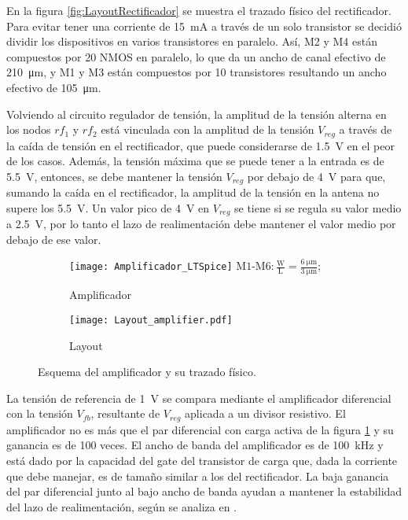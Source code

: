 En la figura \ref{fig:LayoutRectificador} se muestra el trazado físico 
del rectificador. Para evitar tener una corriente de 
\SI{15}{\milli\ampere} a través de un solo transistor se decidió 
dividir los dispositivos en varios transistores en paralelo. Así, M2 y 
M4 están compuestos por 20 NMOS en paralelo, lo que da un ancho de 
canal efectivo de \SI{210}{\micro\meter}, y M1 y M3 están compuestos por 
10 transistores resultando un ancho efectivo de \SI{105}{\micro\meter}.

\bigskip
Volviendo al circuito regulador de tensión, la amplitud de la 
tensión alterna en los nodos \(rf_{1}\) y \(rf_{2}\) está vinculada 
con la amplitud de la tensión \(V_{reg}\) a través de la caída de 
tensión en el rectificador, que puede considerarse de \SI{1.5}{\volt} 
en el peor de los casos. Además, la tensión máxima que se puede 
tener a la entrada es de \SI{5.5}{\volt}, entonces, se debe mantener 
la tensión \(V_{reg}\) por debajo de \SI{4}{\volt} para que, sumando 
la caída en el rectificador, la amplitud de la tensión en la antena 
no supere los \SI{5.5}{\volt}. Un valor pico de \SI{4}{\volt} en 
\(V_{reg}\) se tiene si se regula su valor medio a \SI{2.5}{\volt}, 
por lo tanto el lazo de realimentación debe mantener el valor medio por 
debajo de ese valor.

\begin{figure}
	\centering
	    \begin{subfigure}[b]{0.35\textwidth}
	    \centering
		\texttt{[image: Amplificador\_LTSpice]}
		\(\scriptstyle\mathrm{M1\text{-}M6: \frac{W}{L}}= 
		\frac{\SI{6}{\micro\meter}}{\SI{3}{\micro\meter}};\)
		\caption{Amplificador}
		\label{fig:Amplificador}
	\end{subfigure}
	\quad
	\begin{subfigure}[b]{0.35\textwidth}
	    \centering
		\texttt{[image: Layout\_amplifier.pdf]}
		\caption{Layout}
		\label{fig:LayoutAmplificador}
	\end{subfigure}
	\caption{Esquema del amplificador y su trazado físico.}
	\label{fig:AmplificadorYLayout}
\end{figure}

La tensión de referencia de \SI{1}{\volt} se compara mediante el 
amplificador diferencial con la tensión \(V_{fb}\), resultante de 
\(V_{reg}\) aplicada a un divisor resistivo. El amplificador no es más 
que el par diferencial con carga activa de la figura 
\ref{fig:Amplificador} y su ganancia es de 100 veces. El ancho de banda 
del amplificador es de \SI{100}{\kilo\hertz} y está dado por la 
capacidad del gate del transistor de carga que, dada la corriente que 
debe manejar, es de tamaño similar a los del rectificador. La baja 
ganancia del par diferencial junto al bajo ancho de banda ayudan a 
mantener la estabilidad del lazo de realimentación, según se analiza 
en \cite{Gudnason}.

